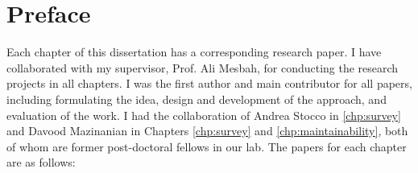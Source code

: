 
\chapter{Preface}

Each chapter of this dissertation has a corresponding 
research paper.  
I have collaborated with my supervisor, Prof. Ali Mesbah, for 
conducting the research projects in all chapters. 
I was the first author and main contributor for all papers, 
including formulating the idea, design and development of the 
approach, and evaluation of the work. I had the collaboration 
of Andrea Stocco in \autoref{chp:survey} and Davood Mazinanian in Chapters \ref{chp:survey} and  \ref{chp:maintainability}, 
both of whom are former post-doctoral fellows in our lab. 
The papers for each chapter are as follows:

